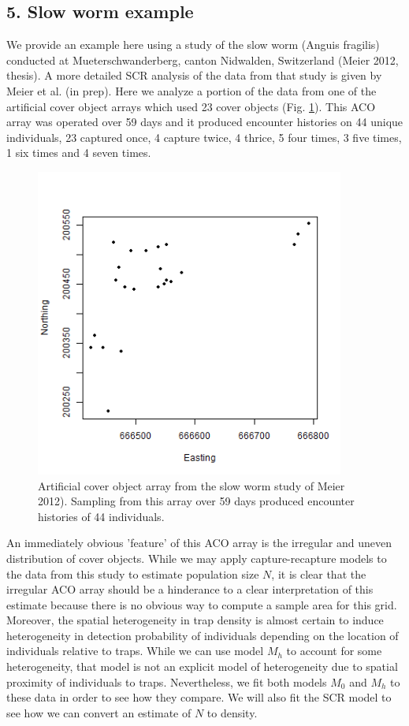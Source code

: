 \documentclass{book}
\begin{document}
\subsection*{5. Slow worm example}

We provide an example here using a study of the slow worm (Anguis
fragilis) conducted at Mueterschwanderberg, canton Nidwalden,
Switzerland (Meier 2012, thesis). A more detailed SCR analysis of the
data from that study is given by Meier et al. (in prep). Here we
analyze a portion of the data from one of the artificial cover object
arrays which used 23 cover objects (Fig. \ref{fig.fig1}). This ACO
array was operated over 59 days and it produced encounter histories on
44 unique individuals, 23 captured once, 4 capture twice, 4 thrice, 5
four times, 3 five times, 1 six times and 4 seven times.
\begin{figure}[h]
\centering
\includegraphics[height=4in,width=4in]{traps.png}
\caption{
Artificial cover object array from the slow worm study of Meier
2012).  Sampling from this array over 59 days produced encounter
histories of 44 individuals. 
}
\label{fig.fig1}
\end{figure}
An immediately obvious 'feature' of this ACO array is the irregular
and uneven distribution of cover objects.  While we may apply
capture-recapture models to the data from this study to estimate
population size $N$, it is clear that the irregular ACO array should
be a hinderance to a clear interpretation of this estimate because
there is no obvious way to compute a sample area for this
grid. Moreover, the spatial heterogeneity in trap density is almost
certain to induce heterogeneity in detection probability of
individuals depending on the location of individuals relative to
traps. While we can use model $M_h$ to account for some heterogeneity,
that model is not an explicit model of heterogeneity due to spatial
proximity of individuals to traps. Nevertheless, we fit both models
$M_0$ and $M_h$ to these data in order to see how they compare.  We
will also fit the SCR model to see how we can convert an estimate of
$N$ to density. 
\end{document}
